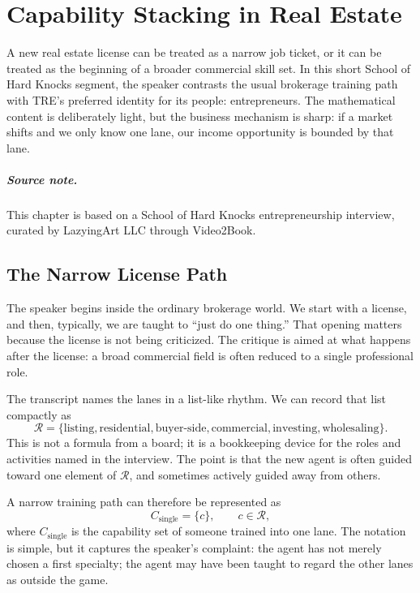 \chapter{Capability Stacking in Real Estate}

A new real estate license can be treated as a narrow job ticket, or it can be treated as the beginning of a broader commercial skill set. In this short School of Hard Knocks segment, the speaker contrasts the usual brokerage training path with TRE's preferred identity for its people: entrepreneurs. The mathematical content is deliberately light, but the business mechanism is sharp: if a market shifts and we only know one lane, our income opportunity is bounded by that lane.

\paragraph{Source note.} This chapter is based on a School of Hard Knocks entrepreneurship interview, curated by LazyingArt LLC through Video2Book.

\section{The Narrow License Path}

The speaker begins inside the ordinary brokerage world. We start with a license, and then, typically, we are taught to ``just do one thing.'' That opening matters because the license is not being criticized. The critique is aimed at what happens after the license: a broad commercial field is often reduced to a single professional role.

The transcript names the lanes in a list-like rhythm. We can record that list compactly as
\begin{equation}
\mathcal{R}
=
\{
\text{listing},
\text{residential},
\text{buyer-side},
\text{commercial},
\text{investing},
\text{wholesaling}
\}.
\end{equation}
This is not a formula from a board; it is a bookkeeping device for the roles and activities named in the interview. The point is that the new agent is often guided toward one element of \(\mathcal{R}\), and sometimes actively guided away from others.

A narrow training path can therefore be represented as
\begin{equation}
C_{\text{single}}=\{c\},
\qquad
c\in \mathcal{R},
\end{equation}
where \(C_{\text{single}}\) is the capability set of someone trained into one lane. The notation is simple, but it captures the speaker's complaint: the agent has not merely chosen a first specialty; the agent may have been taught to regard the other lanes as outside the game.

